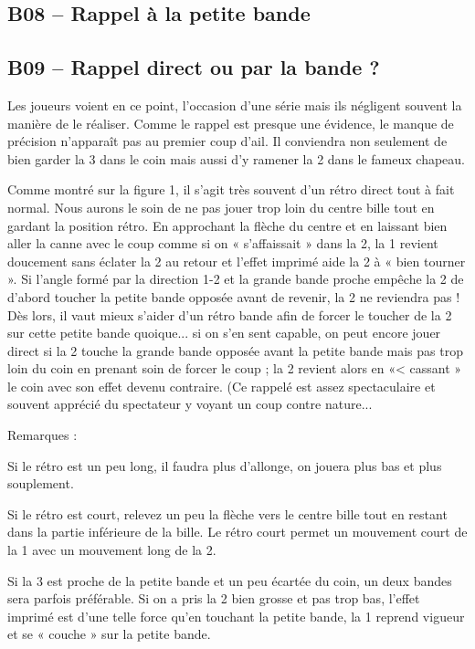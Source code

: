 \subsection{B08 -- Rappel à la petite bande}\label{b08-rappel-uxe0-la-petite-bande}



\subsection{B09 -- Rappel direct ou par la bande
?}\label{b09-rappel-direct-ou-par-la-bande}

Les joueurs voient en ce point, l'occasion d'une série mais ils
négligent souvent la manière de le réaliser. Comme le rappel est presque
une évidence, le manque de précision n'apparaît pas au premier coup
d'ail. Il conviendra non seulement de bien garder la 3 dans le coin mais
aussi d'y ramener la 2 dans le fameux chapeau.

Comme montré sur la figure 1, il s'agit très souvent d'un rétro direct
tout à fait normal. Nous aurons le soin de ne pas jouer trop loin du
centre bille tout en gardant la position rétro. En approchant la flèche
du centre et en laissant bien aller la canne avec le coup comme si on «
s'affaissait » dans la 2, la 1 revient doucement sans éclater la 2 au
retour et l'effet imprimé aide la 2 à « bien tourner ». Si l'angle formé
par la direction 1-2 et la grande bande proche empêche la 2 de d'abord
toucher la petite bande opposée avant de revenir, la 2 ne reviendra pas
! Dès lors, il vaut mieux s'aider d'un rétro bande afin de forcer le
toucher de la 2 sur cette petite bande quoique... si on s'en sent
capable, on peut encore jouer direct si la 2 touche la grande bande
opposée avant la petite bande mais pas trop loin du coin en prenant soin
de forcer le coup ; la 2 revient alors en «\textless{} cassant » le coin
avec son effet devenu contraire. (Ce rappelé est assez spectaculaire et
souvent apprécié du spectateur y voyant un coup contre nature...

Remarques :

Si le rétro est un peu long, il faudra plus d'allonge, on jouera plus
bas et plus souplement.

Si le rétro est court, relevez un peu la flèche vers le centre bille
tout en restant dans la partie inférieure de la bille. Le rétro court
permet un mouvement court de la 1 avec un mouvement long de la 2.

Si la 3 est proche de la petite bande et un peu écartée du coin, un deux
bandes sera parfois préférable. Si on a pris la 2 bien grosse et pas
trop bas, l'effet imprimé est d'une telle force qu'en touchant la petite
bande, la 1 reprend vigueur et se « couche » sur la petite bande.

